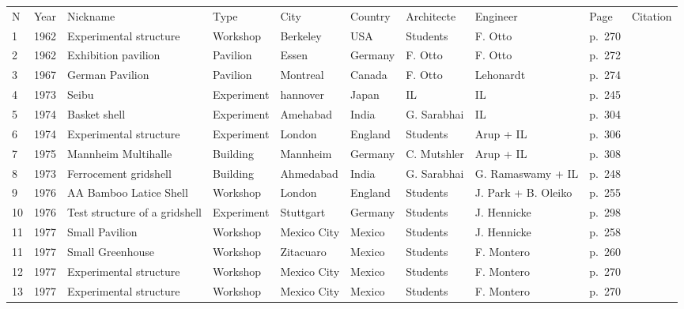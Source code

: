 \begin{landscape}%
\begin{table}[p]
\centering\small
{}
 	\begin{tabular}{@{}llll  lllllr@{}}
	\toprule
N & Year & Nickname & Type & City & Country & Architecte & Engineer & Page & Citation\\
1 & 1962 & Experimental structure  & Workshop & Berkeley & USA & Students & F. Otto & p.~270 & \cite{IL10}\\
2 & 1962 & Exhibition pavilion & Pavilion & Essen & Germany & F. Otto & F. Otto & p.~272 & \cite{IL10}\\
3 & 1967 & German Pavilion & Pavilion & Montreal & Canada & F. Otto & Lehonardt & p.~274 & \cite{IL10}\\
4 & 1973 & Seibu & Experiment & hannover & Japan & IL & IL & p.~245 & \cite{IL13}\\
5 & 1974 & Basket shell & Experiment & Amehabad & India & G. Sarabhai & IL & p.~304 & \cite{IL10}\\
6 & 1974 & Experimental structure  & Experiment & London & England & Students & Arup + IL & p.~306 & \cite{IL10}\\
7 & 1975 & Mannheim Multihalle & Building & Mannheim & Germany & C. Mutshler & Arup + IL & p.~308 & \cite{IL10}\\
8 & 1973 & Ferrocement gridshell & Building & Ahmedabad & India & G. Sarabhai & G. Ramaswamy + IL & p.~248 & \cite{IL13}\\
9 & 1976 & AA Bamboo Latice Shell & Workshop & London & England & Students & J. Park + B. Oleiko & p.~255 & \cite{IL13}\\
10 & 1976 & Test structure of a gridshell & Experiment & Stuttgart & Germany & Students & J. Hennicke & p.~298 & \cite{IL10}\\
11 & 1977 & Small Pavilion & Workshop & Mexico City & Mexico & Students & J. Hennicke & p.~258 & \cite{IL13}\\
11 & 1977 & Small Greenhouse & Workshop & Zitacuaro & Mexico & Students & F. Montero & p.~260 & \cite{IL13}\\
12 & 1977 & Experimental structure & Workshop & Mexico City & Mexico & Students & F. Montero & p.~270 & \cite{IL13}\\
13 & 1977 & Experimental structure & Workshop & Mexico City & Mexico & Students & F. Montero & p.~270 & \cite{IL13}\\

\end{tabular}
\end{table}
\end{landscape}

